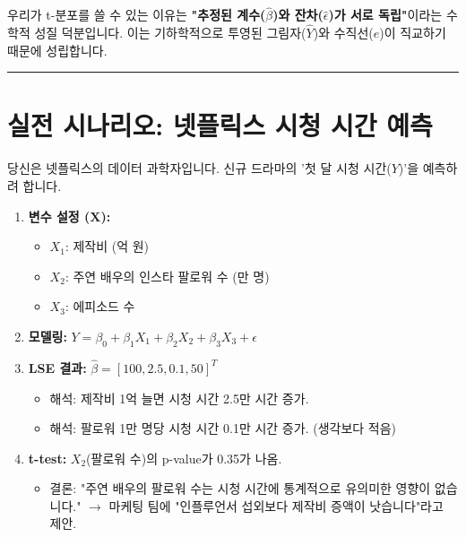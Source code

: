 \documentclass[11pt,a4paper]{book}
\theoremstyle{definition}
\begin{document}
\begin{warningbox}[title={코크란의 정리 (Cochran's Theorem)}]
우리가 t-분포를 쓸 수 있는 이유는 \textbf{"추정된 계수($\hat{\beta}$)와 잔차($\hat{\epsilon}$)가 서로 독립"}이라는 수학적 성질 덕분입니다. 이는 기하학적으로 투영된 그림자($\hat{Y}$)와 수직선($e$)이 직교하기 때문에 성립합니다.
\end{warningbox}

\vspace{0.5cm}\hrule\vspace{0.5cm}

\section{실전 시나리오: 넷플릭스 시청 시간 예측}

\begin{storybox}[title={Scenario: 새로운 드라마의 성공 예측}]
당신은 넷플릭스의 데이터 과학자입니다. 신규 드라마의 '첫 달 시청 시간($Y$)'을 예측하려 합니다.
\end{storybox}

\begin{enumerate}
    \item \textbf{변수 설정 ($\mathbf{X}$):}
    \begin{itemize}
        \item $X_1$: 제작비 (억 원)
        \item $X_2$: 주연 배우의 인스타 팔로워 수 (만 명)
        \item $X_3$: 에피소드 수
    \end{itemize}
    
    \item \textbf{모델링:} $Y = \beta_0 + \beta_1 X_1 + \beta_2 X_2 + \beta_3 X_3 + \epsilon$
    
    \item \textbf{LSE 결과:} $\hat{\beta} = [100, 2.5, 0.1, 50]^T$
    \begin{itemize}
        \item 해석: 제작비 1억 늘면 시청 시간 2.5만 시간 증가.
        \item 해석: 팔로워 1만 명당 시청 시간 0.1만 시간 증가. (생각보다 적음)
    \end{itemize}
    
    \item \textbf{t-test:} $X_2$(팔로워 수)의 p-value가 0.35가 나옴.
    \begin{itemize}
        \item 결론: "주연 배우의 팔로워 수는 시청 시간에 통계적으로 유의미한 영향이 없습니다." $\rightarrow$ 마케팅 팀에 "인플루언서 섭외보다 제작비 증액이 낫습니다"라고 제안.
    \end{itemize}
\end{enumerate}
\end{document}
